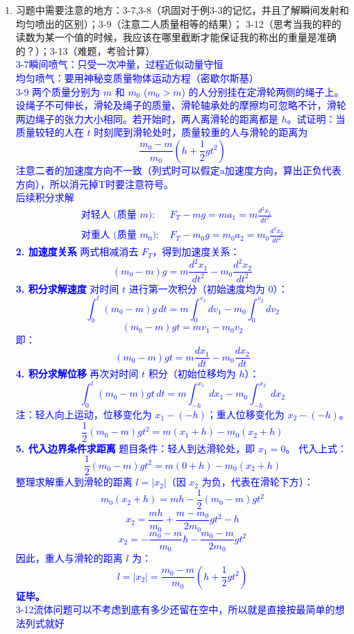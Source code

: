 \documentclass[12pt,a4paper]{article}
\begin{document}
\begin{enumerate}[label=\arabic*.,leftmargin=*]
    \item 习题中需要注意的地方：3-7,3-8（巩固对于例3-3的记忆，并且了解瞬间发射和均匀喷出的区别）；3-9（注意二人质量相等的结果）；
    3-12（思考当我的秤的读数为某一个值的时候，我应该在哪里截断才能保证我的称出的重量是准确的？）；3-13（难题，考验计算）\\
    \textcolor{blue}{
    3-7瞬间喷气：只受一次冲量，过程近似动量守恒\\
    均匀喷气：要用神秘变质量物体运动方程（密歇尔斯基）\\
    3-9
两个质量分别为 $m$ 和 $m_0$ ($m_0 > m$) 的人分别挂在定滑轮两侧的绳子上。设绳子不可伸长，滑轮及绳子的质量、滑轮轴承处的摩擦均可忽略不计，滑轮两边绳子的张力大小相同。若开始时，两人离滑轮的距离都是 $h$。试证明：当质量较轻的人在 $t$ 时刻爬到滑轮处时，质量较重的人与滑轮的距离为
\[
\frac{m_0 - m}{m_0}\left(h + \frac{1}{2}gt^2\right)
\]
注意二者的加速度方向不一致（列式时可以假定a加速度方向，算出正负代表方向），所以消元掉T时要注意符号。\\
后续积分求解
\begin{align*}
\text{对轻人 (质量 } m\text{): } & F_T - mg = ma_1 = m\frac{d^2x_1}{dt^2} \\
\text{对重人 (质量 } m_0\text{): } & F_T - m_0g = m_0a_2 = m_0\frac{d^2x_2}{dt^2}
\end{align*}
\textbf{2. 加速度关系}
两式相减消去 $F_T$，得到加速度关系：
\[
(m_0 - m)g = m\frac{d^2x_1}{dt^2} - m_0\frac{d^2x_2}{dt^2}
\]
\textbf{3. 积分求解速度}
对时间 $t$ 进行第一次积分（初始速度均为 0）：
\[
\int_0^t (m_0 - m)g \, dt = m\int_0^{v_1} dv_1 - m_0\int_0^{v_2} dv_2
\]
\[
(m_0 - m)gt = mv_{1} - m_0v_{2}
\]
即：
\[
(m_0 - m)gt = m\frac{dx_1}{dt} - m_0\frac{dx_2}{dt}
\]
\textbf{4. 积分求解位移}
再次对时间 $t$ 积分（初始位移均为 $h$）：
\[
\int_0^t (m_0 - m)gt \, dt = m\int_{-h}^{x_1} dx_1 - m_0\int_{-h}^{x_2} dx_2
\]
注：轻人向上运动，位移变化为 $x_1 - (-h)$；重人位移变化为 $x_2 - (-h)$。
\[
\frac{1}{2}(m_0 - m)gt^2 = m(x_1 + h) - m_0(x_2 + h)
\]
\textbf{5. 代入边界条件求距离}
题目条件：轻人到达滑轮处，即 $x_1 = 0$。
代入上式：
\[
\frac{1}{2}(m_0 - m)gt^2 = m(0 + h) - m_0(x_2 + h)
\]
整理求解重人到滑轮的距离 $l = |x_2|$（因 $x_2$ 为负，代表在滑轮下方）：
\[
m_0(x_2 + h) = mh - \frac{1}{2}(m_0 - m)gt^2
\]
\[
x_2 = \frac{mh}{m_0} + \frac{m - m_0}{2m_0}gt^2 - h
\]
\[
x_2 = - \frac{m_0 - m}{m_0}h - \frac{m_0 - m}{2m_0}gt^2
\]
因此，重人与滑轮的距离 $l$ 为：
\[
l = \left| x_2 \right| = \frac{m_0 - m}{m_0} \left( h + \frac{1}{2}gt^2 \right)
\]
\textbf{证毕。}
\\3-12流体问题可以不考虑到底有多少还留在空中，所以就是直接按最简单的想法列式就好
}
\end{enumerate}
\end{document}
